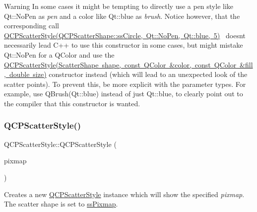 \begin{DoxyWarning}{Warning}
In some cases it might be tempting to directly use a pen style like {\ttfamily Qt\+::\+No\+Pen} as {\itshape pen} and a color like {\ttfamily Qt\+::blue} as {\itshape brush}. Notice however, that the corresponding call~\newline
{\ttfamily \mbox{\hyperlink{class_q_c_p_scatter_style}{Q\+C\+P\+Scatter\+Style(\+Q\+C\+P\+Scatter\+Shape\+::ss\+Circle, Qt\+::\+No\+Pen, Qt\+::blue, 5)}}}~\newline
doesn\textquotesingle{}t necessarily lead C++ to use this constructor in some cases, but might mistake {\ttfamily Qt\+::\+No\+Pen} for a Q\+Color and use the \mbox{\hyperlink{class_q_c_p_scatter_style_a6e1b64f12cac7f07af180ae4316fd38d}{Q\+C\+P\+Scatter\+Style(\+Scatter\+Shape shape, const Q\+Color \&color, const Q\+Color \&fill, double size)}} constructor instead (which will lead to an unexpected look of the scatter points). To prevent this, be more explicit with the parameter types. For example, use {\ttfamily Q\+Brush(\+Qt\+::blue)} instead of just {\ttfamily Qt\+::blue}, to clearly point out to the compiler that this constructor is wanted. 
\end{DoxyWarning}
\mbox{\label{class_q_c_p_scatter_style_a63962094587a4c2258435aa7933996cc}} 
\subsubsection{\texorpdfstring{Q\+C\+P\+Scatter\+Style()}{QCPScatterStyle()}\hspace{0.1cm}{\footnotesize\ttfamily [6/7]}}
{\footnotesize\ttfamily Q\+C\+P\+Scatter\+Style\+::\+Q\+C\+P\+Scatter\+Style (\begin{DoxyParamCaption}\item[{const Q\+Pixmap \&}]{pixmap }\end{DoxyParamCaption})}

Creates a new \mbox{\hyperlink{class_q_c_p_scatter_style}{Q\+C\+P\+Scatter\+Style}} instance which will show the specified {\itshape pixmap}. The scatter shape is set to \mbox{\hyperlink{class_q_c_p_scatter_style_adb31525af6b680e6f1b7472e43859349a8718b849ca7c307b07b8e091efb0c31e}{ss\+Pixmap}}. \mbox{\label{class_q_c_p_scatter_style_a879c30647683b3cfbde2afecea815e6f}} 
